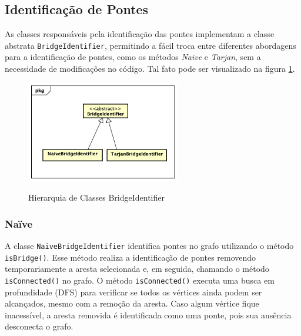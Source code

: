 \subsection{\esp Identificação de Pontes}
As classes responsáveis pela identificação das pontes implementam a classe abstrata \texttt{BridgeIdentifier}, permitindo a fácil troca entre diferentes abordagens para a identificação de pontes, como os métodos \textit{Naïve} e \textit{Tarjan}, sem a necessidade de modificações no código. Tal fato pode ser visualizado na figura \ref{fig:figura3}.

\begin{figure}[ht]
	\centering	
	\caption[\hspace{0.1cm}Grafo.]{Hierarquia de Classes BridgeIdentifier}
	\vspace{-0.4cm}
	\includegraphics[width=0.6\textwidth]{figuras/bridge-identifier-hierarchy.png}
	 \vspace{-0.2cm}
	\label{fig:figura3}
\end{figure}
\vspace{-0.5cm}



\subsubsection{\esp Naïve}

A classe \texttt{NaiveBridgeIdentifier} identifica pontes no grafo utilizando o método \texttt{isBridge()}. Esse método realiza a identificação de pontes removendo temporariamente a aresta selecionada e, em seguida, chamando o método \texttt{isConnected()} no grafo. O método \texttt{isConnected()} executa uma busca em profundidade (DFS) para verificar se todos os vértices ainda podem ser alcançados, mesmo com a remoção da aresta. Caso algum vértice fique inacessível, a aresta removida é identificada como uma ponte, pois sua ausência desconecta o grafo.

